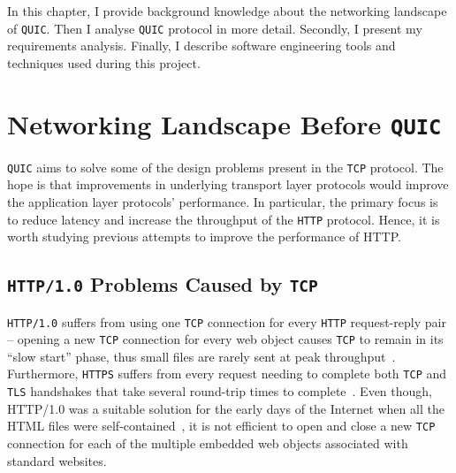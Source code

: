 \documentclass[12pt,a4paper,twoside,openright]{report}
\begin{document}


In this chapter, I provide background knowledge about the networking landscape of \texttt{QUIC}. 
Then I analyse \texttt{QUIC} protocol in more detail.
Secondly, I present my requirements analysis.
Finally, I describe software engineering tools and techniques used during this project.


\section{Networking Landscape Before \texttt{QUIC}} \label{Networking_Landscape_Before_QUIC}
    \texttt{QUIC} aims to solve some of the design problems present in the \texttt{TCP} protocol. The hope is that improvements in underlying transport layer protocols would improve the application layer protocols' performance.
    In particular, the primary focus is to reduce latency and increase the throughput of the \texttt{HTTP} protocol.
    Hence, it is worth studying previous attempts to improve the performance of HTTP.


\subsection{\texttt{HTTP/1.0} Problems Caused by \texttt{TCP}}
    \texttt{HTTP/1.0} suffers from using one \texttt{TCP} connection for every \texttt{HTTP} request-reply pair \cite{TCP_IP_Guide_Book, HTTP_3_the_past_the_present_and_the_future} --
    opening a new \texttt{TCP} connection for every web object causes \texttt{TCP} to remain in its \enquote{slow start} phase, thus small files are rarely sent at peak throughput~\cite{HTTP_3_the_past_the_present_and_the_future}.
    Furthermore, \texttt{HTTPS} suffers from every request needing to complete both \texttt{TCP} and \texttt{TLS} handshakes that take several round-trip times to complete~\cite{HTTP_3_the_past_the_present_and_the_future}.
    Even though, HTTP/1.0 was a suitable solution for the early days of the Internet when all the HTML files were self-contained~\cite{TCP_IP_Guide_Book_2}, it is not efficient to open and close a new \texttt{TCP} connection for each of the multiple embedded web objects associated with standard websites.
\end{document}
